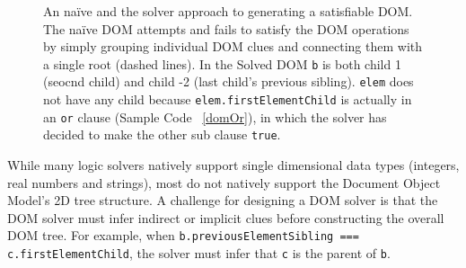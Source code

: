 \begin{figure}[ht]
\centerline{}
\caption[Naive vs. Solved DOM trees]{An na\"{i}ve and the solver approach to generating a satisfiable DOM.  The na\"{i}ve DOM attempts and fails to satisfy the DOM operations by simply grouping individual DOM clues and connecting them with a single root (dashed lines).  In the Solved DOM {\tt b} is both child 1 (seocnd child) and child -2 (last child's previous sibling).  {\tt elem} does not have any child because {\tt elem.firstElementChild} is actually in an {\tt or} clause (Sample Code ~\ref{domOr}), in which the solver has decided to make the other sub clause {\tt true}.}
\label{trees}
\end{figure}


While many logic solvers natively support single dimensional data types (integers, real numbers and strings), most do not natively support the Document Object Model's 2D tree structure.
A challenge for designing a DOM solver is that the DOM solver must infer indirect or implicit clues before constructing the overall DOM tree.  
For example, when {\tt b.previousElementSibling === c.firstElementChild}, the solver must infer that {\tt c} is the parent of {\tt b}.  


